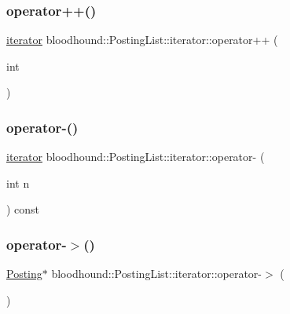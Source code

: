 \subsubsection{\texorpdfstring{operator++()}{operator++()}\hspace{0.1cm}{\footnotesize\ttfamily [2/2]}}
{\footnotesize\ttfamily \hyperlink{structbloodhound_1_1PostingList_1_1iterator}{iterator} bloodhound\+::\+Posting\+List\+::iterator\+::operator++ (\begin{DoxyParamCaption}\item[{int}]{ }\end{DoxyParamCaption})\hspace{0.3cm}{\ttfamily [inline]}}

\mbox{\label{structbloodhound_1_1PostingList_1_1iterator_a61a5de181ff84ddc0976957a7a9fcfd7}} 
\subsubsection{\texorpdfstring{operator-\/()}{operator-()}}
{\footnotesize\ttfamily \hyperlink{structbloodhound_1_1PostingList_1_1iterator}{iterator} bloodhound\+::\+Posting\+List\+::iterator\+::operator-\/ (\begin{DoxyParamCaption}\item[{int}]{n }\end{DoxyParamCaption}) const\hspace{0.3cm}{\ttfamily [inline]}}

\mbox{\label{structbloodhound_1_1PostingList_1_1iterator_a8c9120139692d6672b52d96301718614}} 
\subsubsection{\texorpdfstring{operator-\/$>$()}{operator->()}}
{\footnotesize\ttfamily \hyperlink{structbloodhound_1_1Posting}{Posting}$\ast$ bloodhound\+::\+Posting\+List\+::iterator\+::operator-\/$>$ (\begin{DoxyParamCaption}{ }\end{DoxyParamCaption})\hspace{0.3cm}{\ttfamily [inline]}}

